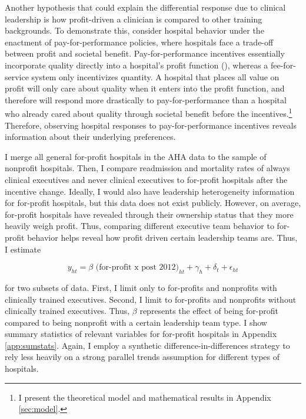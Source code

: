 \documentclass[12pt]{article}
\begin{document}
    Another hypothesis that could explain the differential response due to clinical leadership is how profit-driven a clinician is compared to other training backgrounds. To demonstrate this, consider hospital behavior under the enactment of pay-for-performance policies, where hospitals face a trade-off between profit and societal benefit. Pay-for-performance incentives essentially incorporate quality directly into a hospital's profit function (\cite{dranove2011health}), whereas a fee-for-service system only incentivizes quantity. A hospital that places all value on profit will only care about quality when it enters into the profit function, and therefore will respond more drastically to pay-for-performance than a hospital who already cared about quality through societal benefit before the incentives.\footnote{I present the theoretical model and mathematical results in Appendix \ref{sec:model}.} Therefore, observing hospital responses to pay-for-performance incentives reveals information about their underlying preferences.  

    I merge all general for-profit hospitals in the AHA data to the sample of nonprofit hospitals. Then, I compare readmission and mortality rates of always clinical executives and never clinical executives to for-profit hospitals after the incentive change. Ideally, I would also have leadership heterogeneity information for for-profit hospitals, but this data does not exist publicly. However, on average, for-profit hospitals have revealed through their ownership status that they more heavily weigh profit. Thus, comparing different executive team behavior to for-profit behavior helps reveal how profit driven certain leadership teams are. Thus, I estimate

    \begin{equation}
    \label{eq:forprofit}
    y_{ht} = \beta \text{ (for-profit x post 2012)}_{ht} + \gamma_{h} + \delta_t + \epsilon_{ht}
    \end{equation}

    \noindent for two subsets of data. First, I limit only to for-profits and nonprofits with clinically trained executives. Second, I limit to for-profits and nonprofits without clinically trained executives. Thus, $\beta$ represents the effect of being for-profit compared to being nonprofit with a certain leadership team type. I show summary statistics of relevant variables for for-profit hospitals in Appendix \ref{app:sumstats}. Again, I employ a synthetic difference-in-differences strategy to rely less heavily on a strong parallel trends assumption for different types of hospitals. 
\end{document}
